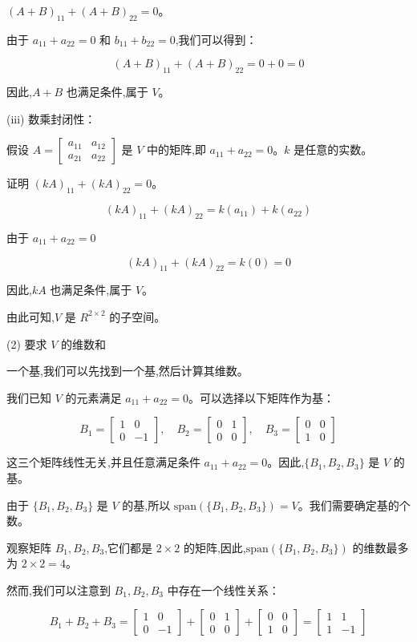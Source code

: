 \documentclass[11pt,letterpaper]{ctexart}
\begin{document}
\begin{enumerate}
$(A + B)_{11} + (A + B)_{22} = 0$。

由于 $a_{11} + a_{22} = 0$ 和 $b_{11} + b_{22} = 0$,我们可以得到：

\[(A + B)_{11} + (A + B)_{22} = 0 + 0 = 0\]

因此,$A + B$ 也满足条件,属于 $V$。

(iii) 数乘封闭性：

假设 $A = \begin{bmatrix} a_{11} & a_{12} \\ a_{21} & a_{22} \end{bmatrix}$ 是 $V$ 中的矩阵,即 $a_{11} + a_{22} = 0$。$k$ 是任意的实数。

证明 $(kA)_{11} + (kA)_{22} = 0$。

\[(kA)_{11} + (kA)_{22} = k(a_{11}) + k(a_{22})\]

由于 $a_{11} + a_{22} = 0$

\[(kA)_{11} + (kA)_{22} = k(0) = 0\]

因此,$kA$ 也满足条件,属于 $V$。

由此可知,$V$ 是 $R^{2\times2}$ 的子空间。

(2) 要求 $V$ 的维数和

一个基,我们可以先找到一个基,然后计算其维数。

我们已知 $V$ 的元素满足 $a_{11} + a_{22} = 0$。可以选择以下矩阵作为基：

\[ B_1 = \begin{bmatrix} 1 & 0 \\ 0 & -1 \end{bmatrix}, \quad B_2 = \begin{bmatrix} 0 & 1 \\ 0 & 0 \end{bmatrix}, \quad B_3 = \begin{bmatrix} 0 & 0 \\ 1 & 0 \end{bmatrix} \]

这三个矩阵线性无关,并且任意满足条件 $a_{11} + a_{22} = 0$。因此,$\{B_1, B_2, B_3\}$ 是 $V$ 的基。

由于 $\{B_1, B_2, B_3\}$ 是 $V$ 的基,所以 $\text{span}(\{B_1, B_2, B_3\}) = V$。我们需要确定基的个数。

观察矩阵 $B_1, B_2, B_3$,它们都是 $2 \times 2$ 的矩阵,因此,$\text{span}(\{B_1, B_2, B_3\})$ 的维数最多为 $2 \times 2 = 4$。

然而,我们可以注意到 $B_1, B_2, B_3$ 中存在一个线性关系：

\[ B_1 + B_2 + B_3 = \begin{bmatrix} 1 & 0 \\ 0 & -1 \end{bmatrix} + \begin{bmatrix} 0 & 1 \\ 0 & 0 \end{bmatrix} + \begin{bmatrix} 0 & 0 \\ 1 & 0 \end{bmatrix} = \begin{bmatrix} 1 & 1 \\ 1 & -1 \end{bmatrix} \]


\end{enumerate}
\end{document}
